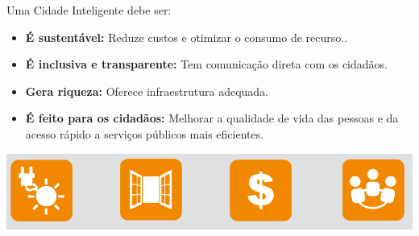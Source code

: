 \documentclass{beamer}
\begin{document}
\begin{frame}{Uma Cidade Inteligente debe ser:}
\begin{block}
 
\begin{itemize}
\item {\bf{É sustentável:}} Reduze custos e otimizar o consumo de recurso.. 
\item {\bf{É inclusiva e transparente:}} Tem comunicação direta com os cidadãos.
\item {\bf{Gera riqueza:}} Oferece infraestrutura adequada.
\item {\bf{É feito para os cidadãos:}} Melhorar a qualidade de vida das pessoas e da acesso rápido a serviços públicos mais eficientes.

\end{itemize}
\end{block} 

\begin{center}
\includegraphics[width=1\textwidth]{img/focos.png}  
\end{center}



\end{frame}
\end{document}
